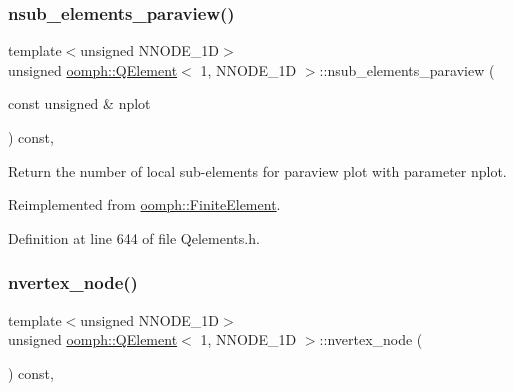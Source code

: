\subsubsection{\texorpdfstring{nsub\+\_\+elements\+\_\+paraview()}{nsub\_elements\_paraview()}}
{\footnotesize\ttfamily template$<$unsigned N\+N\+O\+D\+E\+\_\+1D$>$ \\
unsigned \hyperlink{classoomph_1_1QElement}{oomph\+::\+Q\+Element}$<$ 1, N\+N\+O\+D\+E\+\_\+1D $>$\+::nsub\+\_\+elements\+\_\+paraview (\begin{DoxyParamCaption}\item[{const unsigned \&}]{nplot }\end{DoxyParamCaption}) const\hspace{0.3cm}{\ttfamily [inline]}, {\ttfamily [virtual]}}



Return the number of local sub-\/elements for paraview plot with parameter nplot. 



Reimplemented from \hyperlink{classoomph_1_1FiniteElement_aa1e11deffc8ee67adaa59ce3ade0579f}{oomph\+::\+Finite\+Element}.



Definition at line 644 of file Qelements.\+h.

\mbox{\label{classoomph_1_1QElement_3_011_00_01NNODE__1D_01_4_a751317144972c615b0a7ef7b1340b692}} 
\subsubsection{\texorpdfstring{nvertex\+\_\+node()}{nvertex\_node()}}
{\footnotesize\ttfamily template$<$unsigned N\+N\+O\+D\+E\+\_\+1D$>$ \\
unsigned \hyperlink{classoomph_1_1QElement}{oomph\+::\+Q\+Element}$<$ 1, N\+N\+O\+D\+E\+\_\+1D $>$\+::nvertex\+\_\+node (\begin{DoxyParamCaption}{ }\end{DoxyParamCaption}) const\hspace{0.3cm}{\ttfamily [inline]}, {\ttfamily [virtual]}}




